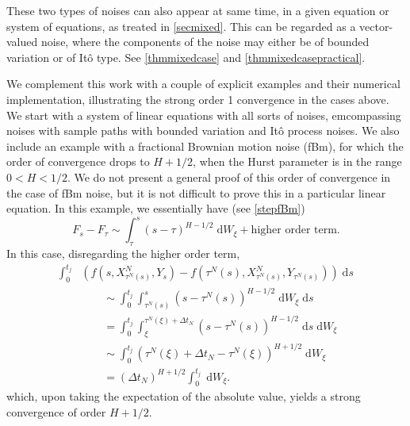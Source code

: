\documentclass[reqno,12pt]{amsart}
\theoremstyle{plain} %
\theoremstyle{definition} %
\begin{document}
These two types of noises can also appear at same time, in a given equation or system of equations, as treated in \cref{secmixed}. This can be regarded as a vector-valued noise, where the components of the noise may either be of bounded variation or of It\^o type. See \cref{thmmixedcase} and \cref{thmmixedcasepractical}.

We complement this work with a couple of explicit examples and their numerical implementation, illustrating the strong order 1 convergence in the cases above. We start with a system of linear equations with all sorts of noises, emcompassing noises with sample paths with bounded variation and It\^o process noises. We also include an example with a fractional Brownian motion noise (fBm), for which the order of convergence drops to $H + 1/2$, when the Hurst parameter is in the range $0 < H < 1/2$. We do not present a general proof of this order of convergence in the case of fBm noise, but it is not difficult to prove this in a particular linear equation. In this example, we essentially have (see \eqref{stepfBm})
\[
    F_s - F_\tau \sim \int_\tau^s (s-\tau)^{H-1/2}\;\mathrm{d}W_\xi + \text{higher order term}.
\]
In this case, disregarding the higher order term,
\begin{align*}
    \int_0^{t_j} & \left( f(s, X_{\tau^N(s)}^N, Y_s) - f(\tau^N(s), X_{\tau^N(s)}^N, Y_{\tau^N(s)}) \right)\;\mathrm{d}s \\ 
    & \qquad \sim \int_0^{t_j} \int_{\tau^N(s)}^s (s-\tau^N(s))^{H-1/2} \;\mathrm{d} W_\xi\;\mathrm{d}s \\
    & \qquad = \int_0^{t_j} \int_{\xi}^{\tau^N(\xi) + \Delta t_N} (s-\tau^N(s))^{H-1/2} \;\mathrm{d}s \;\mathrm{d} W_\xi \\
    & \qquad \sim \int_0^{t_j} (\tau^N(\xi) + \Delta t_N - \tau^N(\xi))^{H+1/2} \;\mathrm{d} W_\xi \\
    & \qquad = (\Delta t_N)^{H+1/2} \int_0^{t_j} \;\mathrm{d} W_\xi.
\end{align*}
which, upon taking the expectation of the absolute value, yields a strong convergence of order $H + 1/2$.
\end{document}

